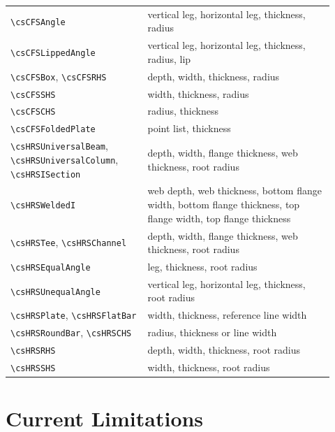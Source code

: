 \documentclass[10pt]{article}
\newcommand{\smallcommand}[1]{{\scriptsize\texttt{\textbackslash #1}}}
\begin{document}
\begin{footnotesize}
\begin{longtable}{@{}L{0.39\linewidth}L{0.53\linewidth}@{}}
\smallcommand{csCFSAngle} & vertical leg, horizontal leg, thickness, radius \\
\smallcommand{csCFSLippedAngle} & vertical leg, horizontal leg, thickness, radius, lip \\
\smallcommand{csCFSBox}, \smallcommand{csCFSRHS} & depth, width, thickness, radius \\
\smallcommand{csCFSSHS} & width, thickness, radius \\
\smallcommand{csCFSCHS} & radius, thickness \\
\smallcommand{csCFSFoldedPlate} & point list, thickness \\
\smallcommand{csHRSUniversalBeam}, \smallcommand{csHRSUniversalColumn}, \smallcommand{csHRSISection} & depth, width, flange thickness, web thickness, root radius \\
\smallcommand{csHRSWeldedI} & web depth, web thickness, bottom flange width, bottom flange thickness, top flange width, top flange thickness \\
\smallcommand{csHRSTee}, \smallcommand{csHRSChannel} & depth, width, flange thickness, web thickness, root radius \\
\smallcommand{csHRSEqualAngle} & leg, thickness, root radius \\
\smallcommand{csHRSUnequalAngle} & vertical leg, horizontal leg, thickness, root radius \\
\smallcommand{csHRSPlate}, \smallcommand{csHRSFlatBar} & width, thickness, reference line width \\
\smallcommand{csHRSRoundBar}, \smallcommand{csHRSCHS} & radius, thickness or line width \\
\smallcommand{csHRSRHS} & depth, width, thickness, root radius \\
\smallcommand{csHRSSHS} & width, thickness, root radius \\
\bottomrule
\end{longtable}
\end{footnotesize}

\section{Current Limitations}
\end{document}
